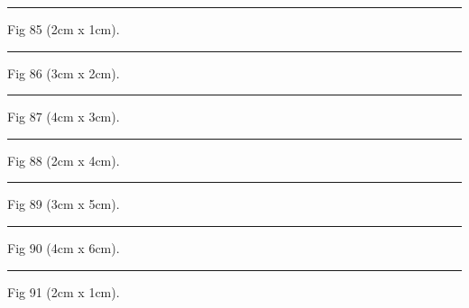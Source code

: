 \documentclass[a4paper,11pt]{article}
\begin{document}
\begin{swarmwrap}%
  \begin{minipage}[t]{2cm}
    \centering
    \rule{\linewidth}{1cm}
    {\footnotesize Fig 85 (2cm x 1cm).}
  \end{minipage}%
\end{swarmwrap}%
\swarmwrapnext
\lipsum[85]%

\begin{swarmwrap}%
  \begin{minipage}[t]{3cm}
    \centering
    \rule{\linewidth}{2cm}
    {\footnotesize Fig 86 (3cm x 2cm).}
  \end{minipage}%
\end{swarmwrap}%
\swarmwrapnext
\lipsum[86]%

\begin{swarmwrap}%
  \begin{minipage}[t]{4cm}
    \centering
    \rule{\linewidth}{3cm}
    {\footnotesize Fig 87 (4cm x 3cm).}
  \end{minipage}%
\end{swarmwrap}%
\swarmwrapnext
\lipsum[87]%

\begin{swarmwrap}%
  \begin{minipage}[t]{2cm}
    \centering
    \rule{\linewidth}{4cm}
    {\footnotesize Fig 88 (2cm x 4cm).}
  \end{minipage}%
\end{swarmwrap}%
\swarmwrapnext
\lipsum[88]%

\begin{swarmwrap}%
  \begin{minipage}[t]{3cm}
    \centering
    \rule{\linewidth}{5cm}
    {\footnotesize Fig 89 (3cm x 5cm).}
  \end{minipage}%
\end{swarmwrap}%
\swarmwrapnext
\lipsum[89]%

\begin{swarmwrap}%
  \begin{minipage}[t]{4cm}
    \centering
    \rule{\linewidth}{6cm}
    {\footnotesize Fig 90 (4cm x 6cm).}
  \end{minipage}%
\end{swarmwrap}%
\swarmwrapnext
\lipsum[90]%

\begin{swarmwrap}%
  \begin{minipage}[t]{2cm}
    \centering
    \rule{\linewidth}{1cm}
    {\footnotesize Fig 91 (2cm x 1cm).}
  \end{minipage}%
\end{swarmwrap}%
\swarmwrapnext
\lipsum[91]%
\end{document}

